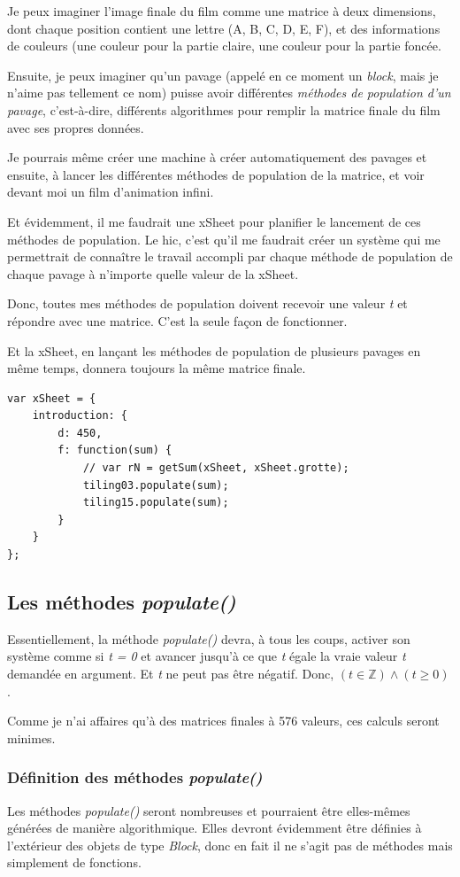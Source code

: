 Je peux imaginer l'image finale du film comme une matrice à deux dimensions, dont chaque position contient une lettre (A, B, C, D, E, F), et des informations de couleurs (une couleur pour la partie claire, une couleur pour la partie foncée.

Ensuite, je peux imaginer qu'un pavage (appelé en ce moment un \textit{block}, mais je n'aime pas tellement ce nom) puisse avoir différentes \textit{méthodes de population d'un pavage}, c'est-à-dire, différents algorithmes pour remplir la matrice finale du film avec ses propres données.

Je pourrais même créer une machine à créer automatiquement des pavages et ensuite, à lancer les différentes méthodes de population de la matrice, et voir devant moi un film d'animation infini.

Et évidemment, il me faudrait une xSheet pour planifier le lancement de ces méthodes de population. Le hic, c'est qu'il me faudrait créer un système qui me permettrait de connaître le travail accompli par chaque méthode de population de chaque pavage à n'importe quelle valeur de la xSheet.

Donc, toutes mes méthodes de population doivent recevoir une valeur \textit{t} et répondre avec une matrice. C'est la seule façon de fonctionner.

Et la xSheet, en lançant les méthodes de population de plusieurs pavages en même temps, donnera toujours la même matrice finale.

\begin{lstlisting}
var xSheet = {
    introduction: {
        d: 450,
        f: function(sum) {
            // var rN = getSum(xSheet, xSheet.grotte);
            tiling03.populate(sum);
            tiling15.populate(sum);
        }
    }
};
\end{lstlisting}
\newpage
\subsection{Les méthodes \textit{populate()}}

Essentiellement, la méthode \textit{populate()} devra, à tous les coups, activer son système comme si \textit{t = 0} et avancer jusqu'à ce que \textit{t} égale la vraie valeur \textit{t} demandée en argument. Et \textit{t} ne peut pas être négatif. 
Donc, $(t \in \mathbb{Z}) \land (t \geq 0)$.

Comme je n'ai affaires qu'à des matrices finales à 576 valeurs, ces calculs seront minimes.

\subsubsection{Définition des méthodes \textit{populate()}}
Les méthodes \textit{populate()} seront nombreuses et pourraient être elles-mêmes générées de manière algorithmique. Elles devront évidemment être définies à l'extérieur des objets de type \textit{Block}, donc en fait il ne s'agit pas de méthodes mais simplement de fonctions.

